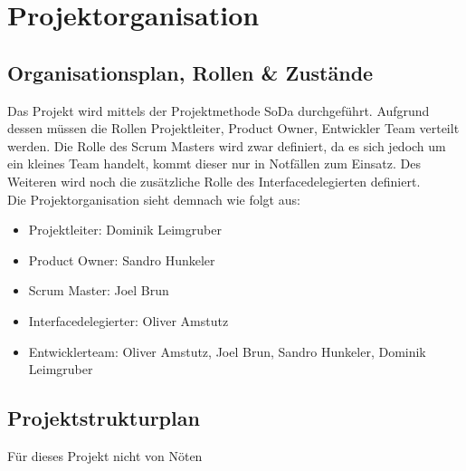 \section{Projektorganisation}
\subsection{Organisationsplan, Rollen \& Zustände}
Das Projekt wird mittels der Projektmethode SoDa durchgeführt. Aufgrund dessen müssen die Rollen Projektleiter, Product Owner, Entwickler Team verteilt werden. Die Rolle des Scrum Masters wird zwar definiert, da es sich jedoch um ein kleines Team handelt, kommt dieser nur in Notfällen zum Einsatz. Des Weiteren wird noch die zusätzliche Rolle des Interfacedelegierten definiert. \\
Die Projektorganisation sieht demnach wie folgt aus:
\begin{itemize}
	\item Projektleiter: Dominik Leimgruber
	\item Product Owner: Sandro Hunkeler
	\item Scrum Master: Joel Brun
	\item Interfacedelegierter: Oliver Amstutz
	\item Entwicklerteam: Oliver Amstutz, Joel Brun, Sandro Hunkeler, Dominik Leimgruber
\end{itemize}
\subsection{Projektstrukturplan}
Für dieses Projekt nicht von Nöten
